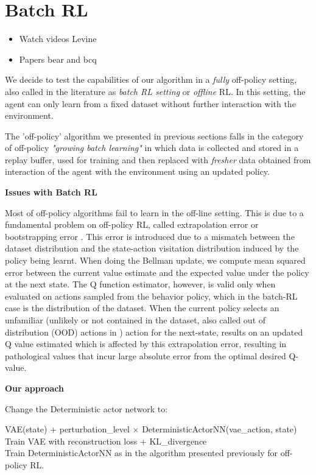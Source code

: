 \chapter{Batch RL}
\begin{itemize}
    \item Watch videos Levine
    \item Papers bear and bcq
    
\end{itemize}

We decide to test the capabilities of our algorithm in a \textit{fully} off-policy setting, 
also called in the literature as \textit{batch RL setting} or \textit{offline} RL. In this setting, the agent 
can only learn from a fixed dataset without further interaction with the environment.


The 'off-policy' algorithm we presented in previous sections falls in the category of 
off-policy \textit{"growing batch learning"} in which data is collected and stored in a replay buffer,
used for training and then replaced with \textit{fresher} data obtained from interaction of the agent with the
environment using an updated policy.

\textbf{Issues with Batch RL}

Most of off-policy algorithms fail to learn in the off-line setting. 
This is due to a fundamental problem on off-policy RL, called extrapolation error \citep{Fujimoto2019} or 
bootstrapping error \citep{Kumar2019}. This error is introduced due to a mismatch
between the dataset distribution and the state-action visitation distribution induced by the
policy being learnt.
When doing the Bellman update, we compute mean squared error between the current value estimate and
the expected value under the policy at the next state.
The Q function estimator, however, is valid only when evaluated on actions sampled from the behavior policy,
which in the batch-RL case is the distribution of the dataset.
When the current policy selects an unfamiliar (unlikely or not contained in the dataset, 
also called out of distribution (OOD) actions in \citep{Kumar2019} ) action for the next-state,
results on an updated Q value estimated which is affected by this extrapolation error,
resulting in pathological values that incur large absolute error from the optimal desired Q-value.


\textbf{Our approach}

Change the Deterministic actor network to:

VAE(state) + perturbation\_level $\times$ DeterministicActorNN(vae\_action, state)\\
Train VAE with reconstruction loss + KL\_divergence\\
Train DeterministicActorNN as in the algorithm presented previously for off-policy RL.